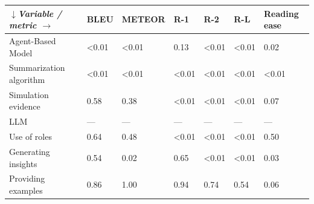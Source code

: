\begin{tabular}{|l|l|l|l|l|l|l|}
\hline
\textit{$\downarrow$Variable / metric $\rightarrow$} & BLEU & METEOR & R-1 & R-2 & R-L & Reading ease \\
 \hline
 Agent-Based Model & \textless{}0.01 & \textless{}0.01 & 0.13 & \textless{}0.01 & \textless{}0.01 & 0.02 \\
 \hline
 Summarization algorithm & \textless{}0.01 & \textless{}0.01 & \textless{}0.01 & \textless{}0.01 & \textless{}0.01 & \textless{}0.01 \\
 \hline
 Simulation evidence & 0.58 & 0.38 & \textless{}0.01 & \textless{}0.01 & \textless{}0.01 & 0.07 \\
 \hline
 LLM & — & — & — & — & — & — \\
 \hline
 Use of roles & 0.64 & 0.48 & \textless{}0.01 & \textless{}0.01 & \textless{}0.01 & 0.50 \\
 \hline
 Generating insights & 0.54 & 0.02 & 0.65 & \textless{}0.01 & \textless{}0.01 & 0.03 \\
 \hline
 Providing examples & 0.86 & 1.00 & 0.94 & 0.74 & 0.54 & 0.06 \\
\hline
\end{tabular}
